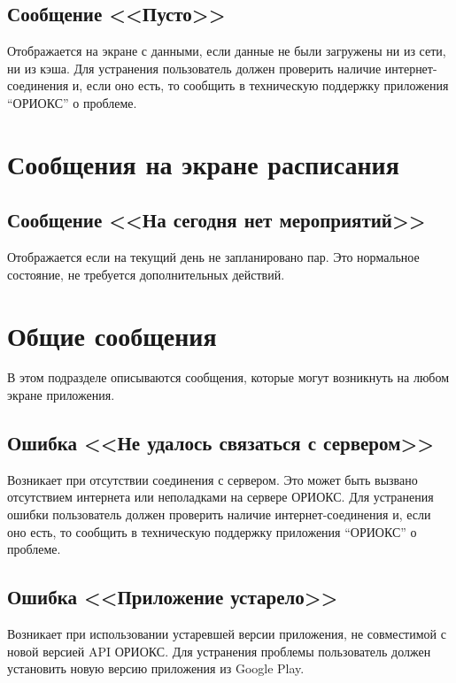 \subsection*{Сообщение <<Пусто>>}
Отображается на экране с данными, если данные не были загружены ни из сети, ни из кэша.
Для устранения пользователь должен проверить наличие интернет-соединения и, если оно есть, то сообщить в техническую поддержку приложения ``ОРИОКС'' о проблеме.

\section{Сообщения на экране расписания}
\label{sec:messages:schedule}

\subsection*{Сообщение <<На сегодня нет мероприятий>>}
Отображается если на текущий день не запланировано пар.
Это нормальное состояние, не требуется дополнительных действий.

\section{Общие сообщения}
\label{sec:messages:common}
В этом подразделе описываются сообщения, которые могут возникнуть на любом экране приложения.

\subsection*{Ошибка <<Не удалось связаться с сервером>>}
Возникает при отсутствии соединения с сервером.
Это может быть вызвано отсутствием интернета или неполадками на сервере ОРИОКС.
Для устранения ошибки пользователь должен проверить наличие интернет-соединения и, если оно есть, то сообщить в техническую поддержку приложения ``ОРИОКС'' о проблеме.

\subsection*{Ошибка <<Приложение устарело>>}
Возникает при использовании устаревшей версии приложения, не совместимой с новой версией API ОРИОКС\@.
Для устранения проблемы пользователь должен установить новую версию приложения из Google Play.
